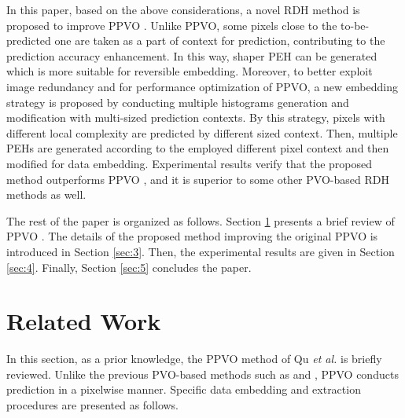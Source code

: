 \documentclass[review,3p,10pt,sort&compress]{elsarticle}
\begin{document}
In this paper, based on the above considerations, a novel RDH method is proposed to improve PPVO \cite{Qu2015PPVO}. Unlike PPVO, some pixels close to the to-be-predicted one are taken as a part of context for prediction, contributing to the prediction accuracy enhancement. In this way, shaper PEH can be generated which is more suitable for reversible embedding. Moreover, to better exploit image redundancy and for performance optimization of PPVO, a new embedding strategy is proposed by conducting multiple histograms generation and modification with multi-sized prediction contexts. By this strategy, pixels with different local complexity are predicted by different sized context. Then, multiple PEHs are generated according to the employed different pixel context and then modified for data embedding. Experimental results verify that the proposed method outperforms PPVO \cite{Qu2015PPVO}, and it is superior to some other PVO-based RDH methods \cite{Peng2014IPVO,Ou2014PVOk} as well.


The rest of the paper is organized as follows. Section \ref{sec:2} presents a brief review of PPVO \cite{Qu2015PPVO}. The details of the proposed method improving the original PPVO is introduced in Section \ref{sec:3}. Then, the experimental results are given in Section \ref{sec:4}. Finally, Section \ref{sec:5} concludes the paper.

\section{Related Work}\label{sec:2}
In this section, as a prior knowledge, the PPVO method of Qu \emph{et al.} \cite{Qu2015PPVO} is briefly reviewed. Unlike the previous PVO-based methods such as \cite{Li2013PVO} and \cite{Peng2014IPVO}, PPVO conducts prediction in a pixelwise manner. Specific data embedding and extraction procedures are presented as follows.

\end{document}
